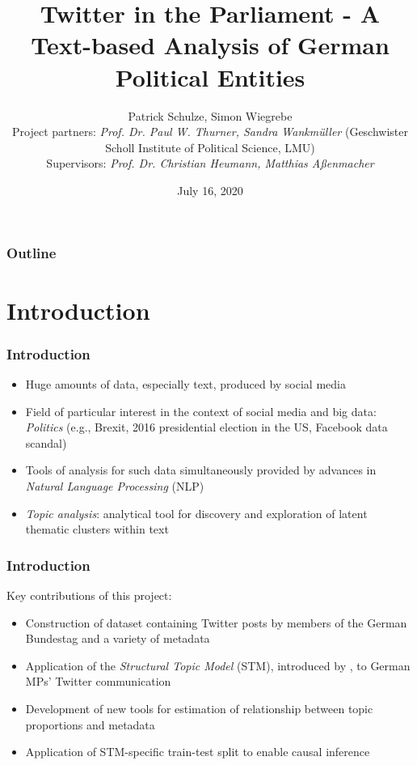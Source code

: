 \documentclass[xcolor=dvipsnames]{beamer}
\title{Twitter in the Parliament - A Text-based Analysis of German Political Entities}
\date{July 16, 2020}
\author[author1]{Patrick Schulze, Simon Wiegrebe\\[5mm]{\tiny
Project partners: \textit{Prof. Dr. Paul W. Thurner, Sandra Wankmüller} (Geschwister Scholl Institute of Political Science, LMU) \\[2mm]
Supervisors: \textit{Prof. Dr. Christian Heumann, Matthias Aßenmacher}
}}
\begin{document}
\begin{frame}
\titlepage
\end{frame}

\begin{frame}
\frametitle{Outline}
\tableofcontents[]
\end{frame}

\section{Introduction}
\begin{frame}
\frametitle{Introduction}
\begin{itemize}
\item Huge amounts of data, especially text, produced by social media
\item Field of particular interest in the context of social media and big data: \textit{Politics} (e.g., Brexit, 2016 presidential election in the US, Facebook data scandal)
\item Tools of analysis for such data simultaneously provided by advances in \textit{Natural Language Processing} (NLP)
\item \textit{Topic analysis}: analytical tool for discovery and exploration of latent thematic clusters within text 
\end{itemize}
\end{frame}

\begin{frame}
\frametitle{Introduction}

Key contributions of this project:
\begin{itemize}
	\item Construction of dataset containing Twitter posts by members of the German Bundestag and a variety of metadata
	\item Application of the \textit{Structural Topic Model} (STM), introduced by \textcite{roberts2016model}, to German MPs' Twitter communication
	\item Development of new tools for estimation of relationship between topic proportions and metadata
	\item Application of STM-specific train-test split to enable causal inference
\end{itemize}
\end{frame}
\end{document}
